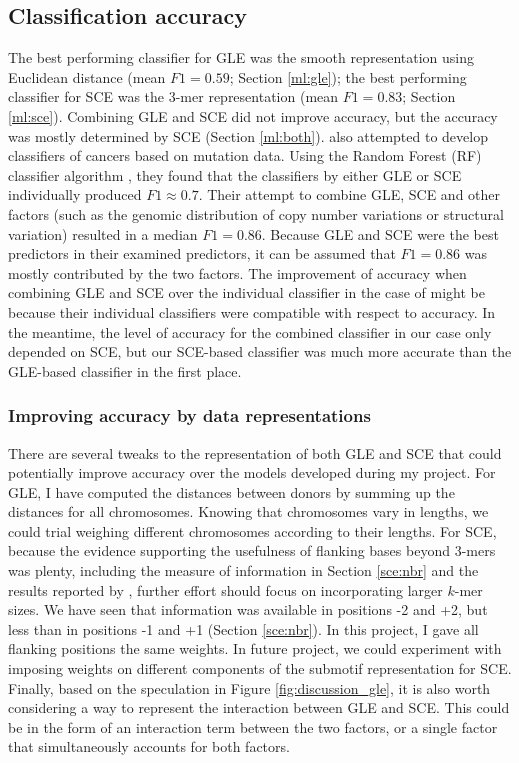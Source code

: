 \subsection{Classification accuracy}
The best performing classifier for GLE was the smooth representation using Euclidean distance (mean $F1=0.59$; Section \ref{ml:gle}); the best performing classifier for SCE was the 3-mer representation (mean $F1=0.83$; Section \ref{ml:sce}). Combining GLE and SCE did not improve accuracy, but the accuracy was mostly determined by SCE (Section \ref{ml:both}). \citet{Jiao2020} also attempted to develop classifiers of cancers based on mutation data. Using the Random Forest (RF) classifier algorithm \citep{Lindner2017AutomatedModels}, they found that the classifiers by either GLE or SCE individually produced $F1\approx0.7$. Their attempt to combine GLE, SCE and other factors (such as the genomic distribution of copy number variations or structural variation) resulted in a median $F1=0.86$. Because GLE and SCE were the best predictors in their examined predictors, it can be assumed that $F1=0.86$ was mostly contributed by the two factors. The improvement of accuracy when combining GLE and SCE over the individual classifier in the case of \citet{Jiao2020} might be because their individual classifiers were compatible with respect to accuracy. In the meantime, the level of accuracy for the combined classifier in our case only depended on SCE, but our SCE-based classifier was much more accurate than the GLE-based classifier in the first place. 

\subsubsection{Improving accuracy by data representations}
There are several tweaks to the representation of both GLE and SCE that could potentially improve accuracy over the models developed during my project. For GLE, I have computed the distances between donors by summing up the distances for all chromosomes. Knowing that chromosomes vary in lengths, we could trial weighing different chromosomes according to their lengths. For SCE, because the evidence supporting the usefulness of flanking bases beyond 3-mers was plenty, including the measure of information in Section \ref{sce:nbr} and the results reported by \citet{Zhang2020}, further effort should focus on incorporating larger $k$-mer sizes. We have seen that information was available in positions -2 and +2, but less than in positions -1 and +1 (Section \ref{sce:nbr}). In this project, I gave all flanking positions the same weights. In future project, we could experiment with imposing weights on different components of the submotif representation for SCE. Finally, based on the speculation in Figure \ref{fig:discussion_gle}, it is also worth considering a way to represent the interaction between GLE and SCE. This could be in the form of an interaction term between the two factors, or a single factor that simultaneously accounts for both factors.

